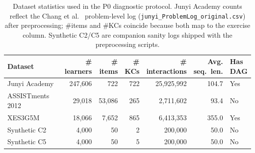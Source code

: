 \begin{table}[t]
\centering
\caption{Dataset statistics used in the P0 diagnostic protocol. Junyi Academy counts reflect the Chang et al.~\cite{chang2015junyi} problem-level log (\texttt{junyi\_ProblemLog\_original.csv}) after preprocessing; \#items and \#KCs coincide because both map to the exercise column. Synthetic C2/C5 are companion sanity logs shipped with the preprocessing scripts.}
\label{tab:dataset-stats}
\footnotesize
\setlength{\tabcolsep}{3pt}
\begin{tabularx}{\linewidth}{@{} >{\RaggedRight\arraybackslash}X rrrrr >{\centering\arraybackslash}X @{}}
\toprule
Dataset & \makecell[r]{\#\\learners} & \makecell[r]{\#\\items} & \makecell[r]{\#\\KCs} & \makecell[r]{\#\\interactions} & \makecell[r]{Avg.\\seq.\ len.} & \makecell{Has\\DAG} \\
\midrule
Junyi Academy & 247,606 & 722 & 722 & 25,925,992 & 104.7 & Yes \\
ASSISTments 2012 & 29,018 & 53,086 & 265 & 2,711,602 & 93.4 & No \\
XES3G5M & 18,066 & 7,652 & 865 & 6,413,353 & 355.0 & Yes \\
Synthetic C2 & 4,000 & 50 & 2 & 200,000 & 50.0 & No \\
Synthetic C5 & 4,000 & 50 & 5 & 200,000 & 50.0 & No \\
\bottomrule
\end{tabularx}
\end{table}
